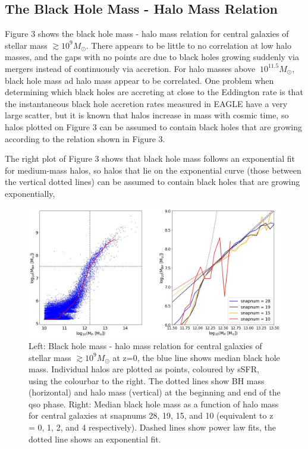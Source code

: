 \documentclass[12pt, twocolumn]{article}%
\begin{document}
\subsection{The Black Hole Mass - Halo Mass Relation}

Figure 3 shows the black hole mass - halo mass relation for central galaxies of stellar mass $\gtrsim10^9M_\odot$. There appears to be little to no correlation at low halo masses, and the gaps with no points are due to black holes growing suddenly via mergers instead of continuously via accretion. For halo masses above $~10^{11.5}M_\odot$, black hole mass ad halo mass appear to be correlated. One problem when determining which black holes are accreting at close to the Eddington rate is that the instantaneous black hole accretion rates measured in EAGLE have a very large scatter, but it is known that halos increase in mass with cosmic time, so halos plotted on Figure 3 can be assumed to contain black holes that are growing according to the relation shown in Figure 3.\par

The right plot of Figure 3 shows that black hole mass follows an exponential fit for medium-mass halos, so halos that lie on the exponential curve (those between the vertical dotted lines) can be assumed to contain black holes that are growing exponentially,

\onecolumngrid


\begin{figure}[H]
\centering
\includegraphics[width=17cm]{Plot_3.jpeg}
\caption{Left: Black hole mass - halo mass relation for central galaxies of stellar mass $\gtrsim10^9M_\odot$ at z=0, the blue line shows median black hole mass. Individual halos are plotted as points, coloured by sSFR, using the colourbar to the right. The dotted lines show BH mass (horizontal) and halo mass (vertical) at the beginning and end of the qso phase. Right: Median black hole mass as a function of halo mass for central galaxies at snapnums 28, 19, 15, and 10 (equivalent to z = 0, 1, 2, and 4 respectively). Dashed lines show power law fits, the dotted line shows an exponential fit.}
\label{fig:3}
\end{figure}
\twocolumngrid
\end{document}
